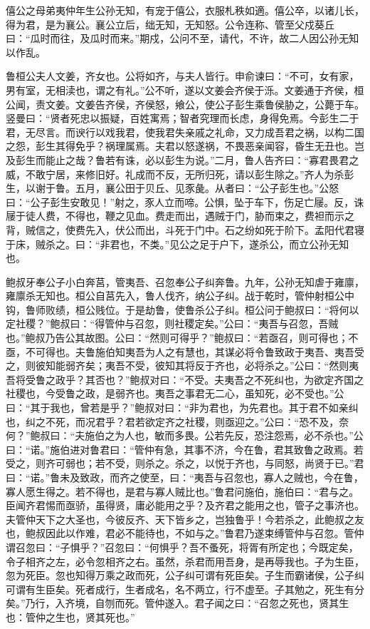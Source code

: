 \documentclass[]{article}
\begin{document}
僖公之母弟夷仲年生公孙无知，有宠于僖公，衣服札秩如適。僖公卒，以诸儿长，得为君，是为襄公。襄公立后，绌无知，无知怒。公令连称、管至父戍葵丘曰：``瓜时而往，及瓜时而来。''期戍，公问不至，请代，不许，故二人因公孙无知以作乱。

鲁桓公夫人文姜，齐女也。公将如齐，与夫人皆行。申俞谏曰：``不可，女有家，男有室，无相渎也，谓之有礼。''公不听，遂以文姜会齐侯于泺。文姜通于齐侯，桓公闻，责文姜。文姜告齐侯，齐侯怒，飨公，使公子彭生乘鲁侯胁之，公薨于车。竖曼曰：``贤者死忠以振疑，百姓寓焉；智者究理而长虑，身得免焉。今彭生二于君，无尽言。而谀行以戏我君，使我君失亲戚之礼命，又力成吾君之祸，以构二国之怨，彭生其得免乎？祸理属焉。夫君以怒遂祸，不畏恶亲闻容，昏生无丑也。岂及彭生而能止之哉？鲁若有诛，必以彭生为说。''二月，鲁人告齐曰：``寡君畏君之威，不敢宁居，来修旧好。礼成而不反，无所归死，请以彭生除之。''齐人为杀彭生，以谢于鲁。五月，襄公田于贝丘、见豕彘。从者曰：``公子彭生也。''公怒曰：``公子彭生安敢见！''射之，豕人立而啼。公惧，坠于车下，伤足亡屦。反，诛屦于徒人费，不得也，鞭之见血。费走而出，遇贼于门，胁而束之，费袒而示之背，贼信之，使费先入，伏公而出，斗死于门中。石之纷如死于阶下。孟阳代君寝于床，贼杀之。曰：``非君也，不类。''见公之足于户下，遂杀公，而立公孙无知也。

鲍叔牙奉公子小白奔莒，管夷吾、召忽奉公子纠奔鲁。九年，公孙无知虐于雍廪，雍廪杀无知也。桓公自莒先入，鲁人伐齐，纳公子纠。战于乾时，管仲射桓公中钩，鲁师败绩，桓公贱位。于是劫鲁，使鲁杀公子纠。桓公问于鲍叔曰：``将何以定社稷？''鲍叔曰：``得管仲与召忽，则社稷定矣。''公曰：``夷吾与召忽，吾贼也。''鲍叔乃告公其故图。公曰：``然则可得乎？''鲍叔曰：``若亟召，则可得也；不亟，不可得也。夫鲁施伯知夷吾为人之有慧也，其谋必将令鲁致政于夷吾、夷吾受之，则彼知能弱齐矣；夷吾不受，彼知其将反于齐也，必将杀之。''公曰：``然则夷吾将受鲁之政乎？其否也？''鲍叔对曰：``不受。夫夷吾之不死纠也，为欲定齐国之社稷也，今受鲁之政，是弱齐也。夷吾之事君无二心，虽知死，必不受也。''公曰：``其于我也，曾若是乎？''鲍叔对曰：``非为君也，为先君也。其于君不如亲纠也，纠之不死，而况君乎？君若欲定齐之社稷，则亟迎之。''公曰：``恐不及，奈何？''鲍叔曰：``夫施伯之为人也，敏而多畏。公若先反，恐注怨焉，必不杀也。''公曰：``诺。''施伯进对鲁君曰：``管仲有急，其事不济，今在鲁，君其致鲁之政焉。若受之，则齐可弱也；若不受，则杀之。杀之，以悦于齐也，与同怒，尚贤于已。''君曰：``诺。''鲁未及致政，而齐之使至，曰：``夷吾与召忽也，寡人之贼也，今在鲁，寡人愿生得之。若不得也，是君与寡人贼比也。''鲁君问施伯，施伯曰：``君与之。臣闻齐君惕而亟骄，虽得贤，庸必能用之乎？及齐君之能用之也，管子之事济也。夫管仲天下之大圣也，今彼反齐、天下皆乡之，岂独鲁乎！今若杀之，此鲍叔之友也，鲍叔因此以作难，君必不能待也，不如与之。''鲁君乃遂束缚管仲与召忽。管仲谓召忽曰：``子惧乎？''召忽曰：``何惧乎？吾不蚤死，将胥有所定也；今既定矣，令子相齐之左，必令忽相齐之右。虽然，杀君而用吾身，是再辱我也。子为生臣，忽为死臣。忽也知得万乘之政而死，公子纠可谓有死臣矣。子生而霸诸侯，公子纠可谓有生臣矣。死者成行，生者成名，名不两立，行不虚至。子其勉之，死生有分矣。''乃行，入齐境，自刎而死。管仲遂入。君子闻之曰：``召忽之死也，贤其生也：管仲之生也，贤其死也。''
\end{document}
